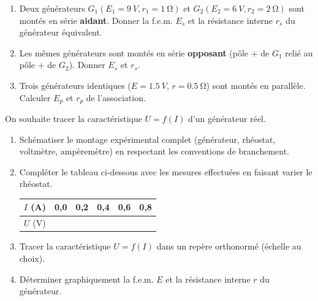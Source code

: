 \documentclass[11pt]{article}
\begin{document}
\begin{exercice}
\begin{enumerate}
    \item Deux générateurs $G_1(E_1 = \SI{9}{V}, r_1 = \SI{1}{\ohm})$ et $G_2(E_2 = \SI{6}{V}, r_2 = \SI{2}{\ohm})$ sont montés en série \textbf{aidant}. Donner la f.e.m. $E_s$ et la résistance interne $r_s$ du générateur équivalent.
    \item Les mêmes générateurs sont montés en série \textbf{opposant} (pôle + de $G_1$ relié au pôle + de $G_2$). Donner $E_s$ et $r_s$.
    \item Trois générateurs identiques ($E = \SI{1,5}{V}$, $r = \SI{0,5}{\ohm}$) sont montés en parallèle. Calculer $E_p$ et $r_p$ de l'association.
\end{enumerate}
\end{exercice}

\begin{exercice}
On souhaite tracer la caractéristique $U = f(I)$ d'un générateur réel.
\begin{enumerate}
    \item Schématiser le montage expérimental complet (générateur, rhéostat, voltmètre, ampèremètre) en respectant les conventions de branchement.
    \item Compléter le tableau ci-dessous avec les mesures effectuées en faisant varier le rhéostat.

    \begin{tabular}{|c|c|c|c|c|c|}
    \hline
    $I$ (\si{\ampere}) & 0,0 & 0,2 & 0,4 & 0,6 & 0,8 \\ \hline
    $U$ (\si{\volt})   &     &     &     &     &     \\ \hline
    \end{tabular}

    \item Tracer la caractéristique $U = f(I)$ dans un repère orthonormé (échelle au choix).
    \item Déterminer graphiquement la f.e.m. $E$ et la résistance interne $r$ du générateur.
\end{enumerate}
\end{exercice}
\end{document}
